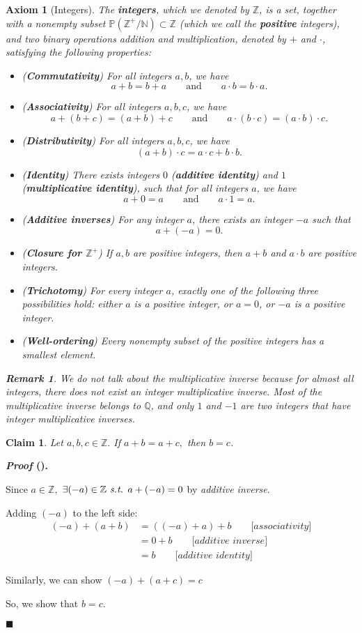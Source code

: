 \documentclass[12pt,a4paper]{article}
\newtheorem{ax}{Axiom}[section]
\newtheorem{clm}{Claim}[subsection]
\newcounter{nprf}[subsection]
\newtheorem*{rmk}{\indent Remark}
\newenvironment*{prf}{\par\indent\textbf{\textit{Proof} (\stepcounter{nprf}\thenprf). }\par }{\par\hfill $\blacksquare$\par}
\def\Z{{\mathbb{Z}}}
\def\Q{{\mathbb{Q}}}
\def\N{{\mathbb{N}}}
\def\Zp{{\Z^{+}}}
\def\st{\emph{ s.t. }}
\begin{document}
\begin{ax}[Integers]
	The \textbf{integers}, which we denoted by $\Z$, is a set, together with a nonempty subset $\mathbb{P}(\Zp/\N)\subset \Z$ (which we call the \textbf{positive} integers), and two binary operations addition and multiplication, denoted by $+$ and $\cdot$, satisfying the following properties: 
	\begin{itemize}
		\item (\textbf{Commutativity}) For all integers $a,b$, we have \[a+b=b+a\qquad\text{and}\qquad a\cdot b=b\cdot a.\]
		\item (\textbf{Associativity}) For all integers $a,b,c$, we have \[a+(b+c)=(a+b)+c\qquad\text{and}\qquad a\cdot(b\cdot c)=(a\cdot b)\cdot c.\]
		\item (\textbf{Distributivity}) For all integers $a,b,c$, we have \[(a+b)\cdot c=a\cdot c+b\cdot b.\]
		\item (\textbf{Identity}) There exists integers $0$ (\textbf{additive identity}) and $1$ (\textbf{multiplicative identity}), such that for all integers $a$, we have \[a+0=a\qquad\text{and}\qquad a\cdot1=a.\]
		\item (\textbf{Additive inverses}) For any integer $a$, there exists an integer $-a$ such that \[a+(-a)=0.\]
		\item (\textbf{Closure for $\Zp$}) If $a,b$ are positive integers, then $a+b$ and $a\cdot b$ are positive integers.
		\item (\textbf{Trichotomy}) For every integer $a$, exactly one of the following three possibilities hold: either $a$ is a positive integer, or $a=0$, or $-a$ is a positive integer. 
		\item (\textbf{Well-ordering}) Every nonempty subset of the positive integers has a smallest element. 
	\end{itemize}
	\begin{rmk} We do not talk about the multiplicative inverse because for almost all integers, there does not exist an integer multiplicative inverse. Most of the multiplicative inverse belongs to $\Q$, and only $1$ and $-1$ are two integers that have integer multiplicative inverses. \end{rmk}
\end{ax}
\begin{framed}
\begin{clm}\label{clm5.1.1}
	Let $a,b,c\in\Z.$ If $a+b=a+c,$ then $b=c$.
\end{clm}
\begin{prf}
	Since $a\in\Z,$ $\exists (-a)\in\Z\st a+(-a)=0$ by \textit{additive inverse}.\par Adding $(-a)$ to the left side: \[\begin{aligned}(-a)+(a+b)&=((-a)+a)+b\qquad\big[\textit{associativity}\big]\\&=0+b\qquad\big[\textit{additive inverse}\big]\\&=b\qquad\big[\textit{additive identity}\big]\end{aligned}\]\par Similarly, we can show $(-a)+(a+c)=c$\par So, we show that $b=c.$
\end{prf}
\end{framed}
\end{document}

